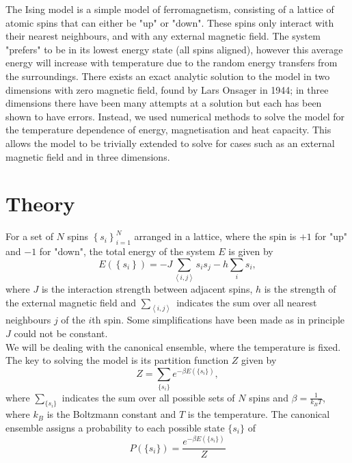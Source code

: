 \documentclass[11pt]{article}
\begin{document}
	The Ising model is a simple model of ferromagnetism, consisting of a lattice of atomic spins that can either be "up" or "down". These spins only interact with their nearest neighbours, and with any external magnetic field. The system "prefers" to be in its lowest energy state (all spins aligned), however this average energy will increase with temperature due to the random energy transfers from the surroundings. There exists an exact analytic solution to the model in two dimensions with zero magnetic field\cite{onsager_solution}, found by Lars Onsager in 1944; in three dimensions there have been many attempts at a solution\cite{das1970exact, lou2000three, zhang2007conjectures, zhang2021exact} but each has been shown to have errors. Instead, we used numerical methods to solve the model for the temperature dependence of energy, magnetisation and heat capacity. This allows the model to be trivially extended to solve for cases such as an external magnetic field and in three dimensions.
	
	\section{Theory}
	
	For a set of $N$ spins $\left\{s_i\right\}_{i=1}^N$ arranged in a lattice, where the spin is $+1$ for "up" and $-1$ for "down", the total energy of the system $E$ is given by\cite{Baierlein_1999}
	\begin{equation}
		E\left(\left\{s_i\right\}\right) = -J\sum_{\left<i,j\right>}s_is_j - h\sum_i s_i,
	\end{equation}
	where $J$ is the interaction strength between adjacent spins, $h$ is the strength of the external magnetic field and $\sum_{\left<i,j\right>}$ indicates the sum over all nearest neighbours $j$ of the $i$th spin. Some simplifications have been made as in principle $J$ could not be constant. \\
	
	We will be dealing with the canonical ensemble, where the temperature is fixed. The key to solving the model is its partition function $Z$ given by
	\begin{equation} \label{eq:PartitionFunction}
		Z = \sum_{\{s_i\}} e^{-\beta E(\{s_i\})},
	\end{equation}
	where $\sum_{\{s_i\}}$ indicates the sum over all possible sets of $N$ spins and $\beta = \frac{1}{k_B T}$, where $k_B$ is the Boltzmann constant and $T$ is the temperature. The canonical ensemble assigns a probability to each possible state $\{s_i\}$ of
	\begin{equation} \label{eq:Probability}
		P(\{s_i\}) = \frac{e^{-\beta E(\{s_i\})}}{Z}
	\end{equation}
\end{document}
